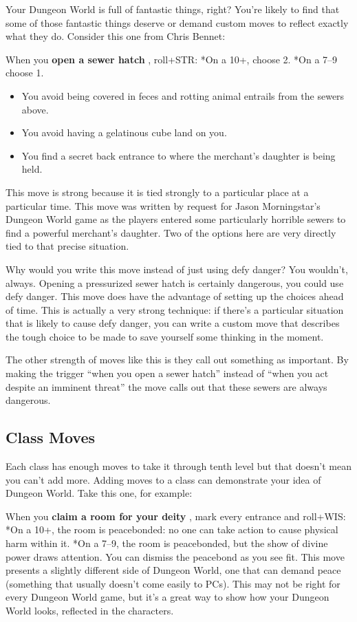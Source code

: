 Your Dungeon World is full of fantastic things, right? You're likely to find that some of those fantastic things deserve or demand custom moves to reflect exactly what they do. Consider this one from Chris Bennet:

\HRule
When you \textbf{open a sewer hatch}
, roll+STR: *On a 10+, choose 2. *On a 7--9 choose 1.
\begin{itemize}
\item You avoid being covered in feces and rotting animal entrails from the sewers above.
\item You avoid having a gelatinous cube land on you.
\item You find a secret back entrance to where the merchant's daughter is being held.
\end{itemize}
\HRule
This move is strong because it is tied strongly to a particular place at a particular time. This move was written by request for Jason Morningstar's Dungeon World game as the players entered some particularly horrible sewers to find a powerful merchant's daughter. Two of the options here are very directly tied to that precise situation.


Why would you write this move instead of just using defy danger? You wouldn't, always. Opening a pressurized sewer hatch is certainly dangerous, you could use defy danger. This move does have the advantage of setting up the choices ahead of time. This is actually a very strong technique: if there's a particular situation that is likely to cause defy danger, you can write a custom move that describes the tough choice to be made to save yourself some thinking in the moment.


The other strength of moves like this is they call out something as important. By making the trigger ``when you open a sewer hatch'' instead of ``when you act despite an imminent threat'' the move calls out that these sewers are always dangerous.
\subsection{Class Moves}


Each class has enough moves to take it through tenth level but that doesn't mean you can't add more. Adding moves to a class can demonstrate your idea of Dungeon World. Take this one, for example:

\HRule
When you \textbf{claim a room for your deity}
, mark every entrance and roll+WIS: *On a 10+, the room is peacebonded: no one can take action to cause physical harm within it. *On a 7--9, the room is peacebonded, but the show of divine power draws attention. You can dismiss the peacebond as you see fit.
\HRule
This move presents a slightly different side of Dungeon World, one that can demand peace (something that usually doesn't come easily to PCs). This may not be right for every Dungeon World game, but it's a great way to show how your Dungeon World looks, reflected in the characters.


